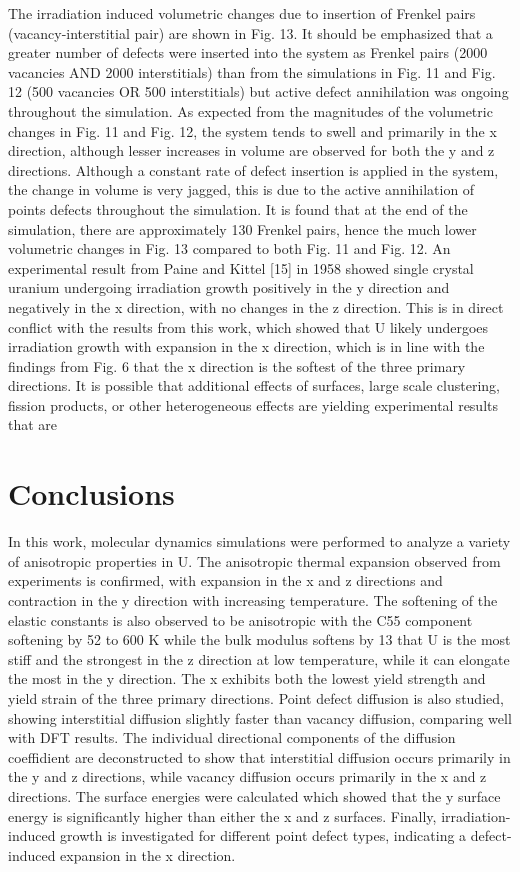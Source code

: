 \documentclass[review]{elsarticle}
\begin{document}
The irradiation induced volumetric changes due to insertion of Frenkel pairs (vacancy-interstitial pair)
are shown in Fig. 13. It should be emphasized that a greater number of defects were inserted into the system
as Frenkel pairs (2000 vacancies AND 2000 interstitials) than from the simulations in Fig. 11 and Fig. 12
(500 vacancies OR 500 interstitials) but active defect annihilation was ongoing throughout the simulation.
As expected from the magnitudes of the volumetric changes in Fig. 11 and Fig. 12, the system tends to
swell and primarily in the x direction, although lesser increases in volume are observed for both the y and z
directions. Although a constant rate of defect insertion is applied in the system, the change in volume is very
jagged, this is due to the active annihilation of points defects throughout the simulation. It is found that
at the end of the simulation, there are approximately 130 Frenkel pairs, hence the much lower volumetric
changes in Fig. 13 compared to both Fig. 11 and Fig. 12.
An experimental result from Paine and Kittel [15] in 1958 showed single crystal uranium undergoing
irradiation growth positively in the y direction and negatively in the x direction, with no changes in the z
direction. This is in direct conflict with the results from this work, which showed that U likely undergoes
irradiation growth with expansion in the x direction, which is in line with the findings from Fig. 6 that the x direction is the softest of the three primary directions. It is possible that additional effects of surfaces, large scale clustering, fission products, or other heterogeneous effects are yielding experimental results that are

\section{Conclusions}
In this work, molecular dynamics simulations were performed to analyze a variety of anisotropic properties
in U. The anisotropic thermal expansion observed from experiments is confirmed, with expansion in the
x and z directions and contraction in the y direction with increasing temperature. The softening of the
elastic constants is also observed to be anisotropic with the C55 component softening by 52%
to 600 K while the bulk modulus softens by 13%
that U is the most stiff and the strongest in the z direction at low temperature, while it can elongate
the most in the y direction. The x exhibits both the lowest yield strength and yield strain of the three
primary directions. Point defect diffusion is also studied, showing interstitial diffusion slightly faster than
vacancy diffusion, comparing well with DFT results. The individual directional components of the diffusion coeffidient are deconstructed to show that interstitial diffusion occurs primarily in the y and z directions, while vacancy diffusion occurs primarily in the x and z directions. The surface energies were calculated which
showed that the y surface energy is significantly higher than either the x and z surfaces. Finally, irradiation-
induced growth is investigated for different point defect types, indicating a defect-induced expansion in the
x direction.
\end{document}
